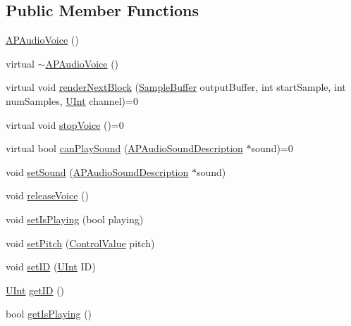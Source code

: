 \subsection*{Public Member Functions}
\begin{DoxyCompactItemize}
\item 
\hyperlink{class_a_p_audio_voice_a59098dc9b3c7b3f8cb369fef98c96506}{A\+P\+Audio\+Voice} ()
\item 
virtual \hyperlink{class_a_p_audio_voice_a7961e8c9c214303de643a6a30e232d47}{$\sim$\+A\+P\+Audio\+Voice} ()
\item 
virtual void \hyperlink{class_a_p_audio_voice_a151ae804092f9c6b9925f450565e3df4}{render\+Next\+Block} (\hyperlink{_a_p_audio_module_8h_a2c2f997fdc6b0e88b3723fb20dc502f0}{Sample\+Buffer} output\+Buffer, int start\+Sample, int num\+Samples, \hyperlink{_a_p_audio_module_8h_a9cc0620fb2e91b51587c6936060d4161}{U\+Int} channel)=0
\item 
virtual void \hyperlink{class_a_p_audio_voice_a25b0e54f49472f05ccafb38c782faae8}{stop\+Voice} ()=0
\item 
virtual bool \hyperlink{class_a_p_audio_voice_a4c534683ad441b5ff7e14ed528e058a4}{can\+Play\+Sound} (\hyperlink{class_a_p_audio_sound_description}{A\+P\+Audio\+Sound\+Description} $\ast$sound)=0
\item 
void \hyperlink{class_a_p_audio_voice_a5bf36c5ec20444b19e6f02c8a1a0ef7d}{set\+Sound} (\hyperlink{class_a_p_audio_sound_description}{A\+P\+Audio\+Sound\+Description} $\ast$sound)
\item 
void \hyperlink{class_a_p_audio_voice_ae14f422e9e88b3be33c2c75ac0876113}{release\+Voice} ()
\item 
void \hyperlink{class_a_p_audio_voice_aff7b4b5bbcc39b3f5f052ad9f5f1c883}{set\+Is\+Playing} (bool playing)
\item 
void \hyperlink{class_a_p_audio_voice_abec08aad18d389152591a381ae1932aa}{set\+Pitch} (\hyperlink{_a_p_audio_module_8h_a9219378a2632ccf0389d00317ce8cdc4}{Control\+Value} pitch)
\item 
void \hyperlink{class_a_p_audio_voice_ab77f46e9e96eed6a2ecf34d295c162b6}{set\+I\+D} (\hyperlink{_a_p_audio_module_8h_a9cc0620fb2e91b51587c6936060d4161}{U\+Int} I\+D)
\item 
\hyperlink{_a_p_audio_module_8h_a9cc0620fb2e91b51587c6936060d4161}{U\+Int} \hyperlink{class_a_p_audio_voice_a7a4588bb43f5c2618da0d0bd405296cc}{get\+I\+D} ()
\item 
bool \hyperlink{class_a_p_audio_voice_ade02900fae46f947b66bfb5148cd282d}{get\+Is\+Playing} ()

\end{DoxyCompactItemize}
